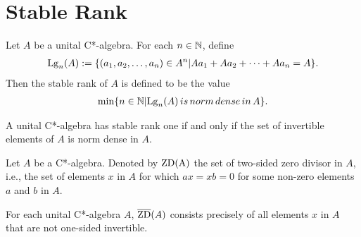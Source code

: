 \section{Stable Rank}

\begin{definition}
  Let $A$ be a unital C*-algebra. For each $n \in \mathbb{N}$, define
  \begin{align*}
    {\rm Lg}_n(A) := \{(a_1,a_2, \ldots, a_n) \in A^n| Aa_1 + Aa_2 + \cdots + Aa_n =A\}.
  \end{align*}
  Then the stable rank of $A$ is defined to be the value
  \begin{align*}
    {\rm min}\{n \in \mathbb{N} | {\rm Lg}_n(A)\, is\, norm\, dense\, in\, A\}.
  \end{align*}
\end{definition}

\begin{proposition}
  A unital C*-algebra has stable rank one if and only if the set of invertible elements of $A$ is norm dense in $A$.
\end{proposition}

\begin{definition}
  Let $A$ be a C*-algebra. Denoted by $\rm{ZD}(A)$ the set of two-sided zero divisor in $A$, i.e.,
  the set of elements $x$ in $A$ for which $ax=xb=0$ for some non-zero elements $a$ and $b$ in $A$.
\end{definition}

\begin{proposition}
  For each unital C*-algebra $A$, $\overline{{\rm ZD}}(A)$ consists precisely of all elements $x$ in $A$ that are not one-sided invertible. 
\end{proposition}

